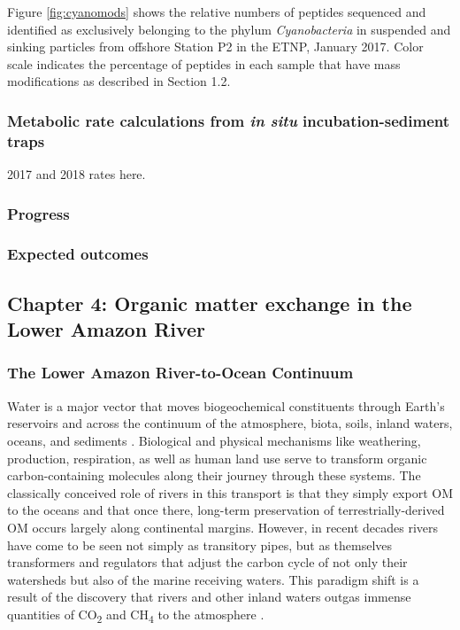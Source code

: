 \documentclass[12pt, letterpaper, twoside]{article}
\begin{document}
Figure \ref{fig:cyanomods} shows the relative numbers of peptides sequenced and identified as exclusively belonging to the phylum \textit{Cyanobacteria} in suspended and sinking particles from offshore Station P2 in the ETNP, January 2017. Color scale indicates the percentage of peptides in each sample that have mass modifications as described in Section 1.2.

\subsubsection{Metabolic rate calculations from \textit{in situ} incubation-sediment traps}

2017 and 2018 rates here. 

\subsubsection*{Progress}

\subsubsection*{Expected outcomes}

\subsection{Chapter 4: Organic matter exchange in the Lower Amazon River}

\subsubsection{The Lower Amazon River-to-Ocean Continuum}

Water is a major vector that moves biogeochemical constituents through Earth's reservoirs and across the continuum of the atmosphere, biota, soils, inland waters, oceans, and sediments \cite{Cole2007Plumbing}. Biological and physical mechanisms like weathering, production, respiration, as well as human land use serve to transform organic carbon-containing molecules along their journey through these systems. The classically conceived role of rivers in this transport is that they simply export OM to the oceans and that once there, long-term preservation of terrestrially-derived OM occurs largely along continental margins. However, in recent decades rivers have come to be seen not simply as transitory pipes, but as themselves transformers and regulators that adjust the carbon cycle of not only their watersheds but also of the marine receiving waters. This paradigm shift is a result of the discovery that rivers and other inland waters outgas immense quantities of CO\textsubscript{2} and CH\textsubscript{4} to the atmosphere \cite{butman_significant_2011, richey_outgassing_2002}. 
\end{document}
